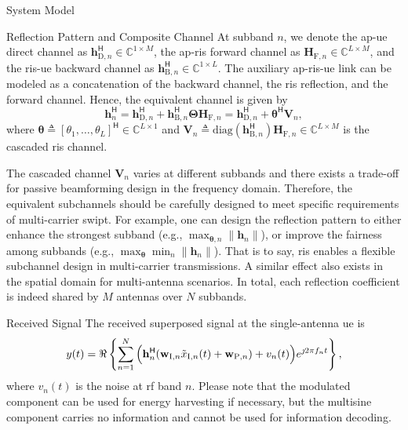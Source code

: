 \begin{section}{System Model}
\begin{subsection}{Reflection Pattern and Composite Channel}
		At subband $n$, we denote the \gls{ap}-\gls{ue} direct channel as $\mathbf{h}_{\mathrm{D},n}^\mathsf{H} \in \mathbb{C}^{1 \times M}$, the \gls{ap}-\gls{ris} forward channel as $\mathbf{H}_{\mathrm{F},n} \in \mathbb{C}^{L \times M}$, and the \gls{ris}-\gls{ue} backward channel as $\mathbf{h}_{\mathrm{B},n}^\mathsf{H} \in \mathbb{C}^{1 \times L}$.
		The auxiliary \gls{ap}-\gls{ris}-\gls{ue} link can be modeled as a concatenation of the backward channel, the \gls{ris} reflection, and the forward channel.
		Hence, the equivalent channel is given by
		\begin{equation}\label{eq:h_n}
			\mathbf{h}_{n}^\mathsf{H} = \mathbf{h}_{\mathrm{D},n}^\mathsf{H} + \mathbf{h}_{\mathrm{B},n}^\mathsf{H} \mathbf{\Theta} \mathbf{H}_{\mathrm{F},n} = \mathbf{h}_{\mathrm{D},n}^\mathsf{H} + \boldsymbol{\theta}^\mathsf{H} \mathbf{V}_{n},
		\end{equation}
		where $\boldsymbol{\theta} \triangleq [\theta_1,\ldots,\theta_L]^\mathsf{H} \in \mathbb{C}^{L \times 1}$ and $\mathbf{V}_{n} \triangleq \mathrm{diag}(\mathbf{h}_{\mathrm{B},n}^\mathsf{H})\mathbf{H}_{\mathrm{F},n} \in \mathbb{C}^{L \times M}$ is the cascaded \gls{ris} channel.

		\begin{remark}\label{rm:subband_tradeoff}
			The cascaded channel $\mathbf{V}_{n}$ varies at different subbands and there exists a trade-off for passive beamforming design in the frequency domain.
			Therefore, the equivalent subchannels should be carefully designed to meet specific requirements of multi-carrier \gls{swipt}. For example, one can design the reflection pattern to either enhance the strongest subband (e.g., $\max_{\boldsymbol{\theta},n} \lVert \mathbf{h}_n \rVert$), or improve the fairness among subbands (e.g., $\max_{\boldsymbol{\theta}} \min_n \lVert \mathbf{h}_n \rVert$). That is to say, \gls{ris} enables a flexible subchannel design in multi-carrier transmissions. A similar effect also exists in the spatial domain for multi-antenna scenarios. In total, each reflection coefficient is indeed shared by $M$ antennas over $N$ subbands.
		\end{remark}
	\end{subsection}


	\begin{subsection}{Received Signal}
		The received superposed signal at the single-antenna \gls{ue} is
		\begin{equation}
			y(t) = \Re\left\{\sum_{n=1}^N{\Bigl(\mathbf{h}_{n}^\mathsf{H}}{(\mathbf{w}_{\mathrm{I},n}\tilde{x}_{\mathrm{I},n}(t)+\mathbf{w}_{\mathrm{P},n})+v_n(t)\Bigr)}{e^{\jmath 2{\pi}{f_n}{t}}}\right\},
		\end{equation}
		where $v_n(t)$ is the noise at \gls{rf} band $n$.
		Please note that the modulated component can be used for energy harvesting if necessary, but the multisine component carries no information and cannot be used for information decoding.
	\end{subsection}



\end{section}
